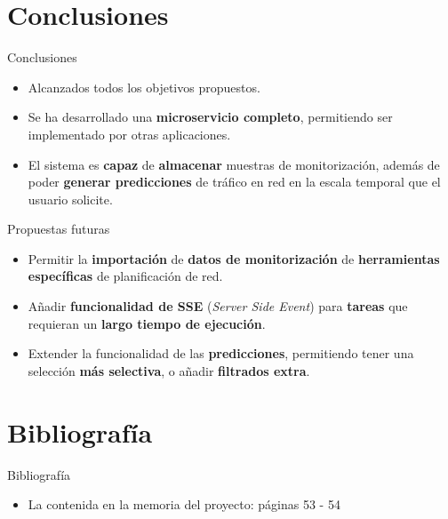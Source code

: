 \documentclass[aspectratio=169,xcolor=dvipsnames]{beamer}
\begin{document}
	
	\section{Conclusiones}
	
	\begin{frame}{Conclusiones}
		\begin{itemize}
			\item Alcanzados todos los objetivos propuestos.
			
			\item Se ha desarrollado una \textbf{microservicio completo}, permitiendo ser implementado por otras aplicaciones.
			
			\item El sistema es \textbf{capaz} de \textbf{almacenar} muestras de monitorización, además de poder \textbf{generar predicciones} de tráfico en red en la escala temporal que el usuario solicite.
		\end{itemize}
	
		\begin{exampleblock}{Propuestas futuras}
			\begin{itemize}
				\item Permitir la \textbf{importación} de \textbf{datos de monitorización} de \textbf{herramientas específicas} de planificación de red.
				
				\item Añadir \textbf{funcionalidad de SSE} (\textit{Server Side Event}) para \textbf{tareas} que requieran un \textbf{largo tiempo de ejecución}.
				
				\item Extender la funcionalidad de las \textbf{predicciones}, permitiendo tener una selección \textbf{más selectiva}, o añadir \textbf{filtrados extra}.
			\end{itemize}
		\end{exampleblock}
	\end{frame}
	
	
	\section{Bibliografía}
	
	\begin{frame}{Bibliografía}
		\begin{itemize}
		    \item La contenida en la memoria del proyecto: páginas 53 - 54
		\end{itemize}
	\end{frame}
	
\end{document}
